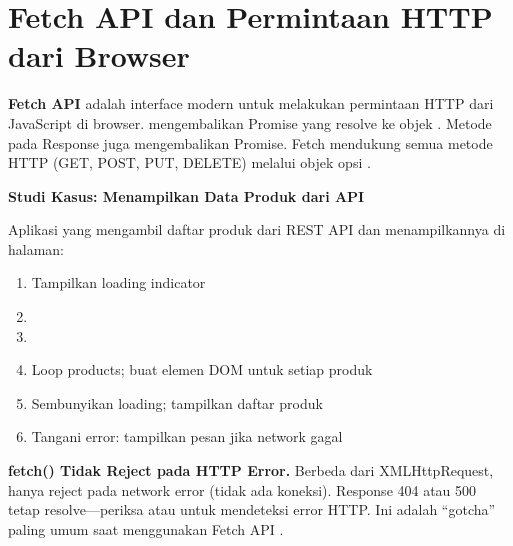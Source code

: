 \section{Fetch API dan Permintaan HTTP dari Browser}

\textbf{Fetch API} adalah interface modern untuk melakukan permintaan HTTP dari JavaScript di browser.  mengembalikan Promise yang resolve ke objek . Metode  pada Response juga mengembalikan Promise. Fetch mendukung semua metode HTTP (GET, POST, PUT, DELETE) melalui objek opsi \cite{jsInfo}.

\begin{contoh}
\textbf{Studi Kasus: Menampilkan Data Produk dari API}

Aplikasi yang mengambil daftar produk dari REST API dan menampilkannya di halaman:
\begin{enumerate}
  \item Tampilkan loading indicator
  \item {}
  \item {}
  \item Loop products; buat elemen DOM untuk setiap produk
  \item Sembunyikan loading; tampilkan daftar produk
  \item Tangani error: tampilkan pesan jika network gagal
\end{enumerate}
\end{contoh}


\begin{catatan}
\textbf{fetch() Tidak Reject pada HTTP Error.} Berbeda dari XMLHttpRequest,  hanya reject pada network error (tidak ada koneksi). Response 404 atau 500 tetap resolve---periksa  atau  untuk mendeteksi error HTTP. Ini adalah ``gotcha'' paling umum saat menggunakan Fetch API \cite{mdnJsGuide}.
\end{catatan}

